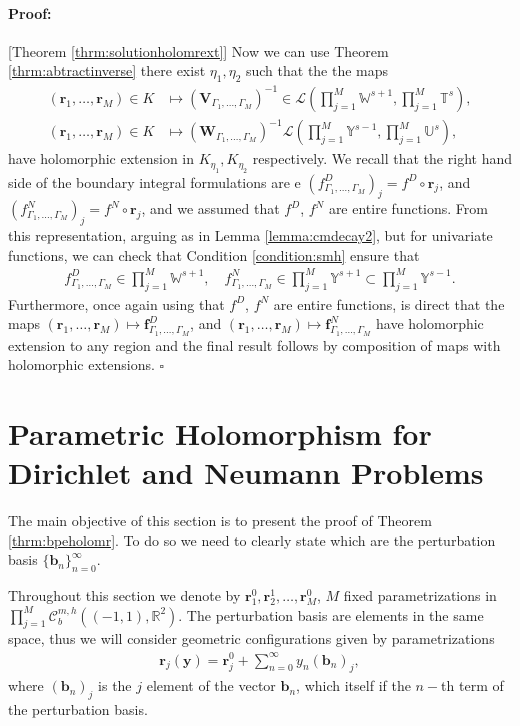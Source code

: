 \documentclass{article}
\newenvironment{proof}{\paragraph{Proof:}}{\hfill$\square$}
\newcommand{\IR}{{\mathbb R}}
\newcommand{\IU}{{\mathbb U}}
\newcommand{\IT}{{\mathbb T}}
\newcommand{\IW}{{\mathbb W}}
\newcommand{\IY}{{\mathbb Y}}
\newcommand{\rgeoh}[2]{\mathcal{C}_b^{#1,#2}\left( (-1,1), \IR^2 \right)}
\newcommand{\br}{\bm{r}}
\newcommand{\by}{\bm{y}}
\newcommand{\bb}{\bm{b}}
\begin{document}
\begin{proof}[Theorem \ref{thrm:solutionholomrext}]
Now we can use Theorem \ref{thrm:abtractinverse} there exist $\eta_1,\eta_2$ such that the the maps 
\begin{align*}
(\br_1,\hdots,\br_M) \in K &\mapsto (\mathbf{V}_{\Gamma_1,\hdots,\Gamma_M})^{-1} \in  \mathcal{L} \left( \prod_{j=1}^M \IW^{s+1}, \prod_{j=1}^M \IT^s \right),\\
(\br_1,\hdots,\br_M) \in K &\mapsto(\mathbf{W}_{\Gamma_1,\hdots,\Gamma_M})^{-1}\mathcal{L} \left( \prod_{j=1}^M \IY^{s-1}, \prod_{j=1}^M \IU^s \right),
\end{align*}
have holomorphic extension in $K_{\eta_1}, K_{\eta_2}$ respectively.
We recall that the right hand side of the boundary integral formulations are e $({f}^D_{\Gamma_1,\hdots,\Gamma_M})_j = f^D \circ \br_j$, and $({f}^N_{\Gamma_1,\hdots,\Gamma_M})_j = f^N \circ \br_j$, and we assumed that $f^D$, $f^N$ are entire functions. From this representation, arguing as in Lemma \ref{lemma:cmdecay2}, but for univariate functions, we can check that Condition \ref{condition:smh} ensure that 
\begin{align*}
{f}^D_{\Gamma_1,\hdots,\Gamma_M} \in \prod_{j=1}^M \IW^{s+1}, \quad {f}^N_{\Gamma_1,\hdots,\Gamma_M} \in \prod_{j=1}^M \IY^{s+1} \subset \prod_{j=1}^M \IY^{s-1}.
\end{align*}
Furthermore, once again using that $f^D$, $f^N$ are entire functions, is direct that the maps $(\br_1,\hdots,\br_M) \mapsto \mathbf{f}^D_{\Gamma_1,\hdots,\Gamma_M}$, and  $(\br_1,\hdots,\br_M) \mapsto \mathbf{f}^N_{\Gamma_1,\hdots,\Gamma_M}$ have holomorphic extension to any region and the final result follows by composition of maps with holomorphic extensions. 
\end{proof}
\section{Parametric Holomorphism for Dirichlet and Neumann Problems}
The main objective of this section is to present the proof of Theorem \ref{thrm:bpeholomr}. To do so we need to clearly state which are the perturbation basis $\{\bb_n\}_{n=0}^\infty$.

Throughout this section we denote by 
$\br^0_1,\br^1_2,\hdots, \br^0_M$, $M$ fixed parametrizations in $\prod_{j=1}^M \rgeoh{m}{h}$.  The perturbation basis are elements in the same space, thus we will consider geometric configurations given by parametrizations 
\begin{align*}
\br_j(\by) = \br^0_j + \sum_{n=0}^\infty y_n (\bb_n)_j ,
\end{align*}
where $(\bb_n)_j$ is the $j$ element of the vector $\bb_n$, which itself if the $n-$th term of the perturbation basis.
\end{document}
